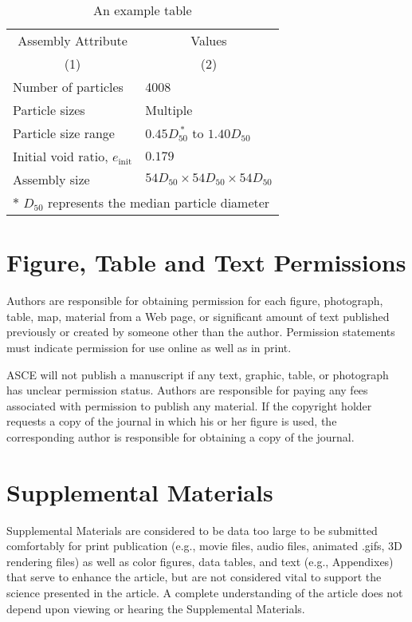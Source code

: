 \documentclass[Journal,letterpaper]{ascelike-new}
\begin{document}
\begin{table}
\caption{An example table}
\label{table:assembly}
\centering
\small
\renewcommand{\arraystretch}{1.25}
\begin{tabular}{l l}
\hline\hline
\multicolumn{1}{c}{Assembly Attribute} &
\multicolumn{1}{c}{Values} \\
\multicolumn{1}{c}{(1)} &
\multicolumn{1}{c}{(2)} \\
\hline
Number of particles & 4008 \\
Particle sizes & Multiple  \\
Particle size range & $0.45D_{50}^{\:\ast}$ to $1.40D_{50}$ \\
Initial void ratio, $e_{\mathrm{init}}$ & $0.179$ \\
Assembly size & $54D_{50} \times 54D_{50} \times 54D_{50}$ \\
\hline
\multicolumn{2}{l}{$\ast$ $D_{50}$ represents the median particle diameter} \\
\hline\hline
\end{tabular}
\normalsize
\end{table}

\section{Figure, Table and Text Permissions}

Authors are responsible for obtaining permission for each figure, photograph, table, map, material from a Web page, or significant amount of text published previously or created by someone other than the author. Permission statements must indicate permission for use online as well as in print.

ASCE will not publish a manuscript if any text, graphic, table, or photograph has unclear permission status. Authors are responsible for paying any fees associated with permission to publish any material. If the copyright holder requests a copy of the journal in which his or her figure is used, the corresponding author is responsible for obtaining a copy of the journal.

\section{Supplemental Materials}

Supplemental Materials are considered to be data too large to be submitted comfortably for print publication (e.g., movie files, audio files, animated .gifs, 3D rendering files) as well as color figures, data tables, and text (e.g., Appendixes) that serve to enhance the article, but are not considered vital to support the science presented in the article. A complete understanding of the article does not depend upon viewing or hearing the Supplemental Materials.
\end{document}
